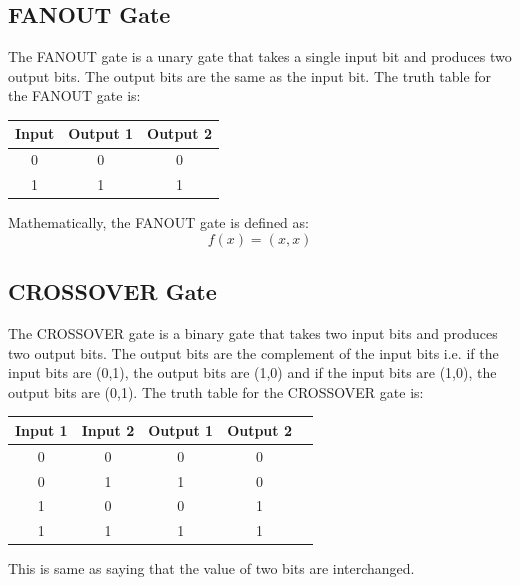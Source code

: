 \documentclass[12pt, oneside]{book}
\theoremstyle{definition}
\theoremstyle{definition}
\theoremstyle{remark}
\begin{document}
\subsection{FANOUT Gate}
The FANOUT gate is a unary gate that takes a single input bit and produces two output bits. The output bits are the same as the input bit.
The truth table for the FANOUT gate is:
\begin{center}
    \begin{tabular}{|c|c|c|}
        \hline
        Input & Output 1 & Output 2 \\
        \hline
        0 & 0 & 0 \\
        1 & 1 & 1 \\
        \hline
    \end{tabular}
\end{center}
Mathematically, the FANOUT gate is defined as:
\[ f(x)=(x,x) \]

\subsection{CROSSOVER Gate}
The CROSSOVER gate is a binary gate that takes two input bits and produces two output bits. The output bits are the complement of the input bits i.e. if the input bits are (0,1), the output bits are (1,0) and if the input bits are (1,0), the output bits are (0,1).
The truth table for the CROSSOVER gate is:
\begin{center}
    \begin{tabular}{|c|c|c|c|c|}
        \hline
        Input 1 & Input 2 & Output 1 & Output 2 \\
        \hline
        0 & 0 & 0 & 0 \\
        0 & 1 & 1 & 0 \\
        1 & 0 & 0 & 1 \\
        1 & 1 & 1 & 1 \\
        \hline
    \end{tabular}
\end{center}
This is same as saying that the value of two bits are interchanged.
\end{document}
